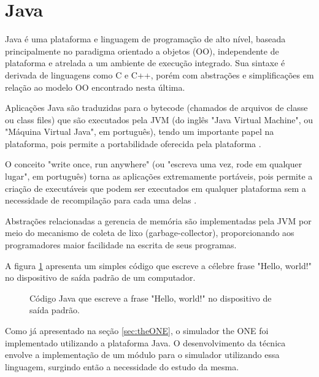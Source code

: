 
\section{Java}\label{sec:java}

Java é uma plataforma e linguagem de programação de alto nível, baseada principalmente no paradigma orientado a objetos (OO), independente de plataforma e atrelada a um ambiente de execução integrado. Sua sintaxe é derivada de linguagens como C e C++, porém com abstrações e simplificações em relação ao modelo OO encontrado nesta última.  \cite{deitel2010java}

Aplicações Java são traduzidas para o bytecode (chamados de arquivos de classe ou class files) que são executados pela JVM (do inglês "Java Virtual Machine", ou "Máquina Virtual Java", em português), tendo um importante papel na plataforma, pois permite a portabilidade oferecida pela plataforma \cite{deitel2010java}. 

O conceito "write once, run anywhere" (ou "escreva uma vez, rode em qualquer lugar", em português) torna as aplicações extremamente portáveis, pois permite a criação de executáveis que podem ser executados em qualquer plataforma sem a necessidade de recompilação para cada uma delas \cite{deitel2010java}.

Abstrações relacionadas a gerencia de memória são implementadas pela JVM por meio do mecanismo de coleta de lixo (garbage-collector), proporcionando aos programadores maior facilidade na escrita de seus programas.

A figura \ref{ola_mundo_java} apresenta um simples código que escreve a célebre frase "Hello, world!" \newline no dispositivo de saída padrão de um computador.

\begin{figure}[htp!]
\centering

\caption{Código Java que escreve a frase "Hello, world!" no dispositivo de saída padrão.}
\label{ola_mundo_java}
\end{figure}

Como já apresentado na seção \ref{sec:theONE}, o simulador the ONE foi implementado utilizando a plataforma Java. O desenvolvimento da técnica envolve a implementação de um módulo para o simulador utilizando essa linguagem, surgindo então a necessidade do estudo da mesma.